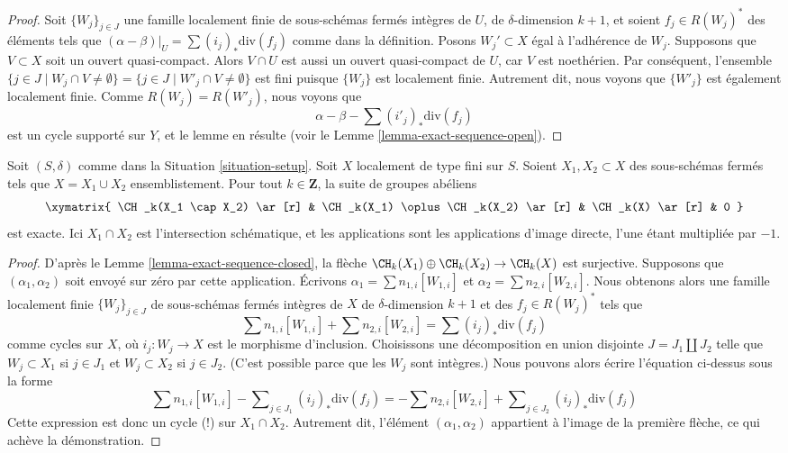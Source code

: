 \begin{proof}
Soit $\{W_j\}_{j \in J}$ une famille localement finie de sous-schémas fermés
intègres de $U$, de $\delta$-dimension $k + 1$, et soient $f_j \in R(W_j)^*$
des éléments tels que $(\alpha - \beta)|_U = \sum (i_j)_*\text{div}(f_j)$
comme dans la définition. Posons $W_j' \subset X$ égal
à l'adhérence de $W_j$. Supposons que $V \subset X$ soit un ouvert
quasi-compact. Alors $V \cap U$ est aussi un ouvert quasi-compact de $U$, car
$V$ est noethérien. Par conséquent, l'ensemble
$\{j \in J \mid W_j \cap V \not = \emptyset\}
= \{j \in J \mid W'_j \cap V \not = \emptyset\}$
est fini puisque $\{W_j\}$ est localement finie. Autrement dit, nous voyons que
$\{W'_j\}$ est également localement finie. Comme $R(W_j) = R(W'_j)$, nous voyons
que
$$
\alpha - \beta - \sum (i'_j)_*\text{div}(f_j)
$$
est un cycle supporté sur $Y$, et le lemme en résulte (voir le
Lemme \ref{lemma-exact-sequence-open}).
\end{proof}

\begin{lemma}
\label{lemma-exact-sequence-closed-chow}
Soit $(S, \delta)$ comme dans la Situation \ref{situation-setup}.
Soit $X$ localement de type fini sur $S$. Soient $X_1, X_2 \subset X$
des sous-schémas fermés tels que $X = X_1 \cup X_2$ ensemblistement.
Pour tout $k \in \mathbf{Z}$, la suite de groupes abéliens
$$
\xymatrix{
\CH_k(X_1 \cap X_2) \ar[r] &
\CH_k(X_1) \oplus \CH_k(X_2) \ar[r] &
\CH_k(X) \ar[r] &
0
}
$$
est exacte. Ici $X_1 \cap X_2$ est l'intersection schématique, et les
applications sont les applications d'image directe, l'une étant multipliée par $-1$.
\end{lemma}

\begin{proof}
D'après le Lemme \ref{lemma-exact-sequence-closed}, la flèche
$\CH_k(X_1) \oplus \CH_k(X_2) \to \CH_k(X)$ est surjective.
Supposons que $(\alpha_1, \alpha_2)$ soit envoyé sur zéro par cette application.
Écrivons $\alpha_1 = \sum n_{1, i}[W_{1, i}]$ et
$\alpha_2 = \sum n_{2, i}[W_{2, i}]$. Nous obtenons alors une famille
localement finie $\{W_j\}_{j \in J}$ de sous-schémas fermés intègres
de $X$ de $\delta$-dimension $k + 1$ et des $f_j \in R(W_j)^*$
tels que
$$
\sum n_{1, i}[W_{1, i}] + \sum n_{2, i}[W_{2, i}] = \sum (i_j)_*\text{div}(f_j)
$$
comme cycles sur $X$, où $i_j : W_j \to X$ est le morphisme d'inclusion.
Choisissons une décomposition en union disjointe $J = J_1 \amalg J_2$ telle que
$W_j \subset X_1$ si $j \in J_1$ et $W_j \subset X_2$ si $j \in J_2$.
(C'est possible parce que les $W_j$ sont intègres.) Nous pouvons alors écrire
l'équation ci-dessus sous la forme
$$
\sum n_{1, i}[W_{1, i}] - \sum\nolimits_{j \in J_1} (i_j)_*\text{div}(f_j) =
- \sum n_{2, i}[W_{2, i}] + \sum\nolimits_{j \in J_2} (i_j)_*\text{div}(f_j)
$$
Cette expression est donc un cycle (!) sur $X_1 \cap X_2$. Autrement dit,
l'élément $(\alpha_1, \alpha_2)$ appartient à l'image de la première flèche,
ce qui achève la démonstration.
\end{proof}

